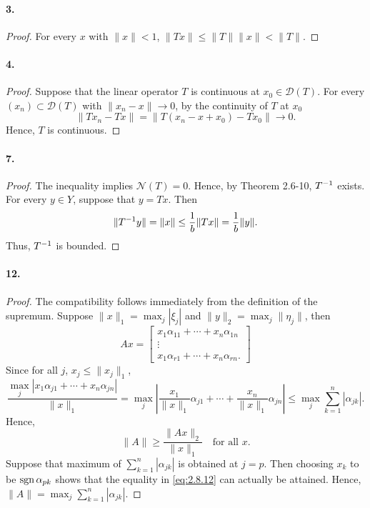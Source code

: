   \paragraph{3.}
  \begin{proof}
    For every $x$ with $\|x\|<1$, $\|Tx\|\le \|T\|\|x\|<\|T\|$.
  \end{proof}

  \paragraph{4.}
  \begin{proof}
    Suppose that the linear operator $T$ is continuous at $x_0\in
    \mathcal{D}(T)$. For every $(x_n)\subset\mathcal{D}(T)$ with $\|x_n-x\|\to
    0$, by the continuity of $T$ at $x_0$
    \[
      \|Tx_n-Tx\|=\|T(x_n-x+x_0)-Tx_0\| \to 0.
    \]
    Hence, $T$ is continuous.
  \end{proof}

  \paragraph{7.}
  \begin{proof}
    The inequality implies $\mathcal{N}(T)=0$. Hence, by Theorem 2.6-10, $T^{-1}$
    exists. For every $y\in Y$, suppose that $y=Tx$. Then
    \[
      \|T^{-1} y\| = \|x\| \le \frac{1}{b}\|Tx\| = \frac{1}{b}\|y\|.
    \]
    Thus, $T^{-1}$ is bounded.
  \end{proof}

  \paragraph{12.}
  \begin{proof}
    The compatibility follows immediately from the definition of the supremum.
    Suppose $\|x\|_1=\max_j|\xi_j|$ and $\|y\|_2=\max_j\|\eta_j\|$, then
    \[
      Ax = 
      \begin{bmatrix}
        x_1\alpha_{11} + \cdots + x_n\alpha_{1n} \\
        \vdots \\
        x_1\alpha_{r1} + \cdots + x_n\alpha_{rn}.
      \end{bmatrix}
    \]
    Since for all $j$, $x_j\le \|x_j\|_1$,
    \[
      \frac{\max_j|x_1\alpha_{j1}+\cdots+x_n\alpha_{jn}|}{\|x\|_1}
      =\max_j\left|\frac{x_1}{\|x\|_1}\alpha_{j1}+\cdots
      +\frac{x_n}{\|x\|_1}\alpha_{jn}\right|
      \le \max_{j}\sum_{k=1}^n|\alpha_{jk}|.
    \]
    Hence, 
    \begin{equation}
      \label{eq:2.8.12}
      \|A\|\ge \frac{\|Ax\|_2}{\|x\|_1} \quad\text{for all $x$}.
    \end{equation}
    Suppose that maximum of $\sum_{k=1}^n|\alpha_{jk}|$ is obtained at $j=p$.
    Then choosing $x_k$ to be $\operatorname{sgn} \alpha_{pk}$ shows that the equality in 
    \eqref{eq:2.8.12} can actually be attained. Hence, $\|A\|=\max_{j}
    \sum_{k=1}^n|\alpha_{jk}|$.
  \end{proof}

